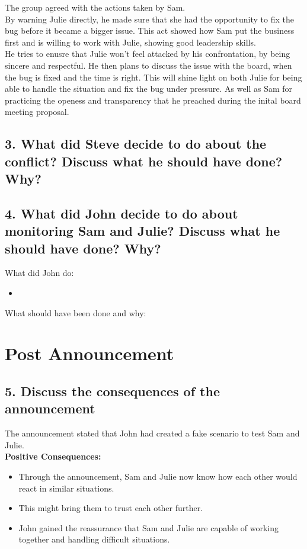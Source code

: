 \documentclass[a4paper,10pt]{article}
\begin{document}
The group agreed with the actions taken by Sam. \\
By warning Julie directly, he made sure that she had the opportunity to fix the bug before it became a bigger issue. This act showed how Sam put the business first and is willing to work with Julie, showing good leadership skills.\\

He tries to enusre that Julie won't feel attacked by his confrontation, by being sincere and respectful. He then plans to discuss the issue with the board, when the bug is fixed and the time is right. This will shine light on both Julie for being able to handle the situation and fix the bug under pressure. As well as Sam for practicing the openess and transparency that he preached during the inital board meeting proposal.\\


\subsection{3. What did Steve decide to do about the conflict? Discuss what he should have done? Why?}

\subsection{4. What did John decide to do about monitoring Sam and Julie? Discuss what he should have done? Why?}

What did John do:
\begin{itemize}
    \item 
\end{itemize}

What should have been done and why:

\section{Post Announcement}
\subsection{5. Discuss the consequences of the announcement}
\author{Graham Pellgrini}
The announcement stated that John had created a fake scenario to test Sam and Julie.\\

\textbf{Positive Consequences:}
\begin{itemize}
    \item Through the announcement, Sam and Julie now know how each other would react in similar situations.
    \item This might bring them to trust each other further.
    \item John gained the reassurance that Sam and Julie are capable of working together and handling difficult situations.
\end{itemize}
\end{document}
